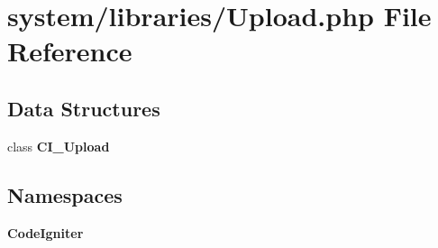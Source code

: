 \section{system/libraries/\-Upload.php File Reference}
\label{_upload_8php}
\subsection*{Data Structures}
\begin{DoxyCompactItemize}
\item 
class {\bf C\-I\-\_\-\-Upload}
\end{DoxyCompactItemize}
\subsection*{Namespaces}
\begin{DoxyCompactItemize}
\item 
{\bf Code\-Igniter}
\end{DoxyCompactItemize}
